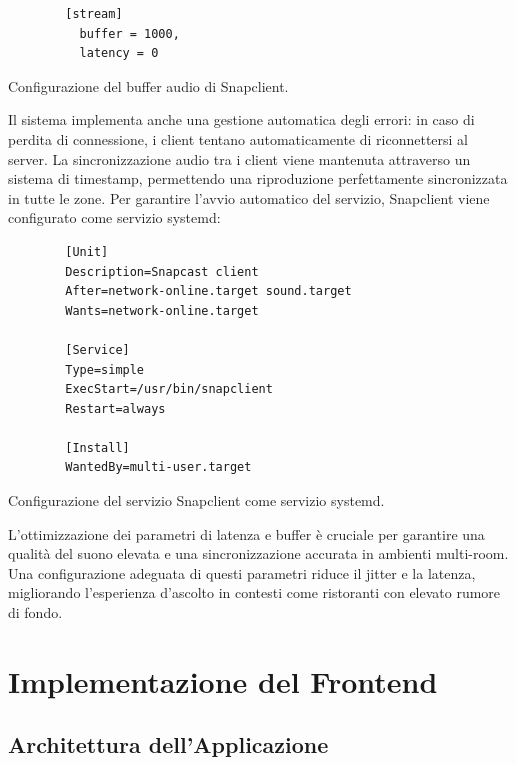 \begin{table}[H]
  \begin{algorithm}[H]
    \caption{}
    \BlankLine
    \begin{verbatim}
        [stream]
          buffer = 1000,
          latency = 0
    \end{verbatim}
  \end{algorithm}
  \caption{Configurazione del buffer audio di Snapclient.}
\end{table}

Il sistema implementa anche una gestione automatica degli errori: in caso di perdita di connessione, i client tentano automaticamente di riconnettersi al server. La sincronizzazione audio tra i client viene mantenuta attraverso un sistema di timestamp, permettendo una riproduzione perfettamente sincronizzata in tutte le zone.
Per garantire l'avvio automatico del servizio, Snapclient viene configurato come servizio systemd:

\begin{table}[H]
  \begin{algorithm}[H]
    \caption{}
    \BlankLine
      \begin{verbatim}
        [Unit]
        Description=Snapcast client
        After=network-online.target sound.target
        Wants=network-online.target
  
        [Service]
        Type=simple
        ExecStart=/usr/bin/snapclient
        Restart=always
  
        [Install]
        WantedBy=multi-user.target
      \end{verbatim}
    \end{algorithm}
    \caption{Configurazione del servizio Snapclient come servizio systemd.}
    \label{tab:snapclient_service}
  \end{table}

  L'ottimizzazione dei parametri di latenza e buffer è cruciale per garantire una qualità del suono elevata e una sincronizzazione accurata in ambienti multi-room. 
  Una configurazione adeguata di questi parametri riduce il jitter e la latenza, migliorando l'esperienza d'ascolto in contesti come ristoranti con elevato rumore di fondo. \cite{7990980}

\newpage
\section{Implementazione del Frontend}
\noindent


\subsection{Architettura dell'Applicazione}

